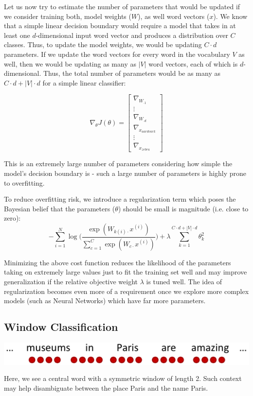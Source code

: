 \documentclass{tufte-handout}
\begin{document}
Let us now try to estimate the number of parameters that would be updated if we consider training both, model weights ($W$), as well word vectors ($x$). We know that a simple linear decision boundary would require a model that takes in at least one $d$-dimensional input word vector and produces a distribution over $C$ classes. Thus, to update the model weights, we would be updating $C\cdot d$ parameters. If we update the word vectors for every word in the vocabulary $V$ as well, then we would be updating as many as $|V|$ word vectors, each of which is $d$-dimensional. Thus, the total number of parameters would be as many as $C\cdot d + |V|\cdot d$ for a simple linear classifier:

$$\nabla_{\theta} J(\theta) = \left[ \begin{array}{c} \nabla_{W_{\cdot 1}} \\  \vdots \\  \nabla_{W_{\cdot d}} \\ \nabla_{x_{aardvark}} \\ \vdots  \\ \nabla_{x_{zebra}} \end{array} \right] $$

This is an extremely large number of parameters considering how simple the model's decision boundary is - such a large number of parameters is highly prone to overfitting.

To reduce overfitting risk, we introduce a regularization term which poses the Bayesian belief that the parameters ($\theta$) should be small is magnitude (i.e. close to zero): 
$$-\sum_{i = 1}^N\log \bigg(\frac{\exp(W_{k{(i)}\cdot}x^{(i)})}{\sum_{c=1}^C\exp(W_{c\cdot}x^{(i)})}\bigg) + \lambda \sum_{k=1}^{C\cdot d + |V|\cdot d} \theta_k^2$$

Minimizing the above cost function reduces the likelihood of the parameters taking on extremely large values just to fit the training set well and may improve generalization if the relative objective weight $\lambda$ is tuned well. The idea of regularization becomes even more of a requirement once we explore more complex models (such as Neural Networks) which have far more parameters.

\subsection{Window Classification}

\begin{marginfigure}%
  \includegraphics[width = \linewidth]{window}
  \caption{Here, we see a central word with a symmetric window of length 2. Such context may help disambiguate between the place Paris and the name Paris.}
    \label{fig:window}
\end{marginfigure}
\end{document}
